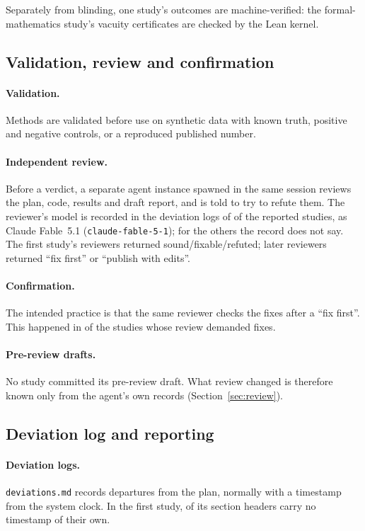 \documentclass[11pt]{article}
\begin{document}
Separately from blinding, one study's outcomes are machine-verified: the formal-mathematics study's vacuity
certificates are checked by the Lean kernel.

\subsection{Validation, review and confirmation}

\paragraph{Validation.} Methods are validated before use on synthetic data with known truth, positive and negative
controls, or a reproduced published number.

\paragraph{Independent review.} Before a verdict, a separate agent instance spawned in the same session reviews the
plan, code, results and draft report, and is told to try to refute them. The reviewer's model is recorded in the
deviation logs of \ReviewerModelRecorded{} of the \StudiesReported{} reported studies, as Claude Fable~5.1
(\texttt{claude-fable-5-1}); for the others the record does not say. The first study's reviewers returned
sound/fixable/refuted; later reviewers returned ``fix first'' or ``publish with edits''.

\paragraph{Confirmation.} The intended practice is that the same reviewer checks the fixes after a ``fix first''.
This happened in \ReviewConfAmongFix{} of the \ReviewFixOrRefuted{} studies whose review demanded fixes.

\paragraph{Pre-review drafts.} No study committed its pre-review draft. What review changed is therefore known only
from the agent's own records (Section~\ref{sec:review}).

\subsection{Deviation log and reporting}

\paragraph{Deviation logs.} \texttt{deviations.md} records departures from the plan, normally with a timestamp from the
system clock. In the first study, \GWTCHeadersNoTime{} of its \GWTCHeaders{} section headers carry no timestamp of
their own.
\end{document}

